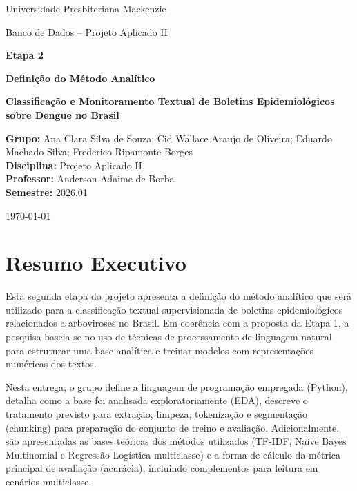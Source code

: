 \hypersetup{pageanchor=false}

\begin{titlepage}
    \centering
    {\large Universidade Presbiteriana Mackenzie \par}
    \vspace{0.4cm}
    {\large Banco de Dados – Projeto Aplicado II \par}
    \vspace{2.0cm}
    {\Large \textbf{Etapa 2} \par}
    \vspace{0.4cm}
    {\large \textbf{Definição do Método Analítico} \par}
    \vspace{1.4cm}
    {\Large \textbf{Classificação e Monitoramento Textual de Boletins Epidemiológicos sobre Dengue no Brasil} \par}
    \vfill

    \begin{flushleft}
    \textbf{Grupo:} Ana Clara Silva de Souza; Cid Wallace Araujo de Oliveira; Eduardo Machado Silva; Frederico Ripamonte Borges \\
    \textbf{Disciplina:} Projeto Aplicado II \\
    \textbf{Professor:} Anderson Adaime de Borba \\
    \textbf{Semestre:} 2026.01
    \end{flushleft}

    \vfill
    {\large \today \par}
\end{titlepage}

\clearpage
\hypersetup{pageanchor=true}
\setcounter{page}{1}

\section*{Resumo Executivo}

Esta segunda etapa do projeto apresenta a definição do método analítico que será utilizado para a classificação textual supervisionada de boletins epidemiológicos relacionados a arboviroses no Brasil. Em coerência com a proposta da Etapa 1, a pesquisa baseia-se no uso de técnicas de processamento de linguagem natural para estruturar uma base analítica e treinar modelos com representações numéricas dos textos.

Nesta entrega, o grupo define a linguagem de programação empregada (Python), detalha como a base foi analisada exploratoriamente (EDA), descreve o tratamento previsto para extração, limpeza, tokenização e segmentação (chunking) para preparação do conjunto de treino e avaliação. Adicionalmente, são apresentadas as bases teóricas dos métodos utilizados (TF-IDF, Naive Bayes Multinomial e Regressão Logística multiclasse) e a forma de cálculo da métrica principal de avaliação (acurácia), incluindo complementos para leitura em cenários multiclasse.

